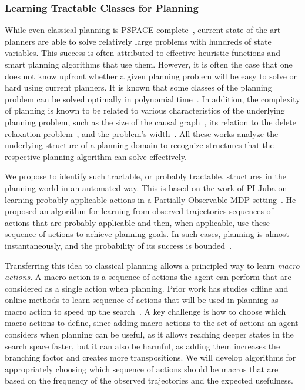 \documentclass[12pt]{article}
\begin{document}
\subsubsection{Learning Tractable Classes for Planning}
While even classical planning is PSPACE complete~\cite{bylander1994computational}, 
current state-of-the-art planners are able to solve relatively large problems with hundreds of state variables. This success is often attributed to effective heuristic functions and smart planning algorithms that use them. However, it is often the case that one does not know upfront whether a given planning problem will be easy to solve or hard using current planners. It is known that some classes of the planning problem can be solved optimally in polynomial time~\cite{katz2008new}. In addition, the complexity of planning is known to be related to various characteristics of the underlying planning problem, such as the size of the causal graph~\cite{gimenez2012influence}, its relation to the delete relaxation problem~\cite{hoffmann2011analyzing}, and the problem's width~\cite{lipovetzky2012width}. All these works analyze the underlying structure of a planning domain to recognize structures that the respective planning algorithm can solve effectively. %

We propose to identify such tractable, or probably tractable, structures in the planning world in an automated way. This is based on the work of PI Juba on learning probably applicable 
actions in a Partially Observable MDP setting~\cite{juba2016jmlr}. He proposed 
an algorithm for learning from observed trajectories sequences of actions that are probably applicable and then, when applicable, use these sequence of actions to achieve planning goals. 
In such cases, planning is almost instantaneously, and the probability of its success is bounded~\cite{juba2016jmlr}. 


Transferring this idea to classical planning allows a principled way to learn {\em macro actions}. A macro action is a sequence of actions the agent can perform that are considered as a single action when planning. Prior work has studies offline and online methods to learn sequence of actions that will be used in planning as macro action to speed up the search~\cite{chrpa2014mum,coles2007marvin,chrpa2015online,koedinger1990abstract,korf1985macro}. A key challenge is how to choose which macro actions to define, since adding macro actions to the set of actions an agent considers when planning can be useful, as it allows reaching deeper states in the search space faster, but it can also be harmful, as adding them increases the branching factor and creates more transpositions. We will develop algorithms for appropriately choosing which sequence of actions should be macros that are based on the frequency of the observed trajectories and the expected usefulness.  
\end{document}
